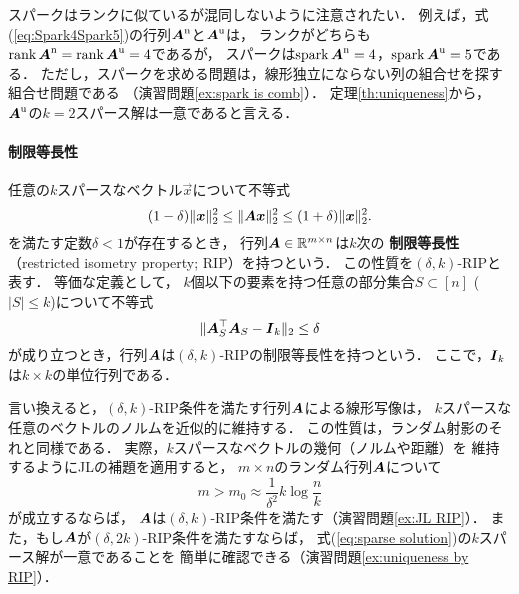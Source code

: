 スパークはランクに似ているが混同しないように注意されたい．
例えば，式(\ref{eq:Spark4Spark5})の行列$\mbox{\boldmath $A$}^{\mbox{\scriptsize n}}$と$\mbox{\boldmath $A$}^{\mbox{\scriptsize u}}$は，
ランクがどちらも$\mathop{\textrm{rank}}\nolimits\mbox{\boldmath $A$}^{\mbox{\scriptsize n}}=\mathop{\textrm{rank}}\nolimits\mbox{\boldmath $A$}^{\mbox{\scriptsize u}}=4$であるが，
スパークは$\mathop{\textrm{spark}}\nolimits\mbox{\boldmath $A$}^{\mbox{\scriptsize n}}=4$，$\mathop{\textrm{spark}}\nolimits\mbox{\boldmath $A$}^{\mbox{\scriptsize u}}=5$である．
ただし，スパークを求める問題は，線形独立にならない列の組合せを探す
組合せ問題である
（演習問題\ref{ex:spark is comb}）．
定理\ref{th:uniqueness}から，
$\mbox{\boldmath $A$}^{\mbox{\scriptsize u}}$の$k=2$スパース解は一意であると言える．



\paragraph{制限等長性}
\begin{definition}
任意の$k$スパースなベクトル$\vec x$について不等式
\begin{equation}
(1-\delta)\|\mbox{\boldmath $x$}\|_2^2\leq\|\mbox{\boldmath $A$}\mbox{\boldmath $x$}\|_2^2\leq(1+\delta)\|\mbox{\boldmath $x$}\|_2^2.
\label{eq:RIP}
\end{equation}
を満たす定数$\delta<1$が存在するとき，
行列$\mbox{\boldmath $A$}\in\mathbb{R}^{m\times n}$は$k$次の
{\bf 制限等長性}（restricted isometry property; RIP）を持つという．
この性質を$(\delta,k)$-RIPと表す．
等価な定義として，
$k$個以下の要素を持つ任意の部分集合$S\subset[n]$ ($|S|\leq k$)について不等式
\begin{equation}
 \|\mbox{\boldmath $A$}_S^\top\mbox{\boldmath $A$}_S-\mbox{\boldmath $I$}_k\|_2\leq\delta
\end{equation}
が成り立つとき，行列$\mbox{\boldmath $A$}$は$(\delta,k)$-RIPの制限等長性を持つという．
ここで，$\mbox{\boldmath $I$}_k$は$k\times k$の単位行列である．
\end{definition}
言い換えると，$(\delta,k)$-RIP条件を満たす行列$\mbox{\boldmath $A$}$による線形写像は，
$k$スパースな任意のベクトルのノルムを近似的に維持する．
この性質は，ランダム射影のそれと同様である．
実際，$k$スパースなベクトルの幾何（ノルムや距離）を
維持するようにJLの補題\cite{JL84}を適用すると，
$m\times n$のランダム行列$\mbox{\boldmath $A$}$について
\begin{equation}
 m> m_0\approx\frac{1}{\delta^2}k\log\frac{n}{k}
\label{eq:random projection with RIP}
\end{equation}
が成立するならば，
$\mbox{\boldmath $A$}$は$(\delta,k)$-RIP条件を満たす（演習問題\ref{ex:JL RIP}）．
また，もし$\mbox{\boldmath $A$}$が$(\delta,2k)$-RIP条件を満たすならば，
式(\ref{eq:sparse solution})の$k$スパース解が一意であることを
簡単に確認できる（演習問題\ref{ex:uniqueness by RIP}）．

